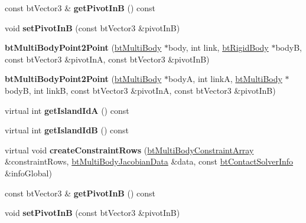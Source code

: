 \begin{DoxyCompactItemize}
const bt\+Vector3 \& {\bfseries get\+Pivot\+InB} () const
\item 
\mbox{\label{classbtMultiBodyPoint2Point_acbf08dcd31ad18b9ffd8d07231ee5d4c}} 
void {\bfseries set\+Pivot\+InB} (const bt\+Vector3 \&pivot\+InB)
\item 
\mbox{\label{classbtMultiBodyPoint2Point_a0c1306efc09b87bb9d39111daf82daf5}} 
{\bfseries bt\+Multi\+Body\+Point2\+Point} (\hyperlink{classbtMultiBody}{bt\+Multi\+Body} $\ast$body, int link, \hyperlink{classbtRigidBody}{bt\+Rigid\+Body} $\ast$bodyB, const bt\+Vector3 \&pivot\+InA, const bt\+Vector3 \&pivot\+InB)
\item 
\mbox{\label{classbtMultiBodyPoint2Point_af7a950d153633ec5b7b41e8c91f54073}} 
{\bfseries bt\+Multi\+Body\+Point2\+Point} (\hyperlink{classbtMultiBody}{bt\+Multi\+Body} $\ast$bodyA, int linkA, \hyperlink{classbtMultiBody}{bt\+Multi\+Body} $\ast$bodyB, int linkB, const bt\+Vector3 \&pivot\+InA, const bt\+Vector3 \&pivot\+InB)
\item 
\mbox{\label{classbtMultiBodyPoint2Point_abcfffad3d62a3c796324ef046dc6d455}} 
virtual int {\bfseries get\+Island\+IdA} () const
\item 
\mbox{\label{classbtMultiBodyPoint2Point_aa98ae020484c7f4233374bde5ee0ba90}} 
virtual int {\bfseries get\+Island\+IdB} () const
\item 
\mbox{\label{classbtMultiBodyPoint2Point_af2ed486b29f41dc9ad8fd78310d584da}} 
virtual void {\bfseries create\+Constraint\+Rows} (\hyperlink{classbtAlignedObjectArray}{bt\+Multi\+Body\+Constraint\+Array} \&constraint\+Rows, \hyperlink{structbtMultiBodyJacobianData}{bt\+Multi\+Body\+Jacobian\+Data} \&data, const \hyperlink{structbtContactSolverInfo}{bt\+Contact\+Solver\+Info} \&info\+Global)
\item 
\mbox{\label{classbtMultiBodyPoint2Point_a00f053d579e5fd0bf2475c043fa8e0d7}} 
const bt\+Vector3 \& {\bfseries get\+Pivot\+InB} () const
\item 
\mbox{\label{classbtMultiBodyPoint2Point_acbf08dcd31ad18b9ffd8d07231ee5d4c}} 
void {\bfseries set\+Pivot\+InB} (const bt\+Vector3 \&pivot\+InB)
\end{DoxyCompactItemize}
